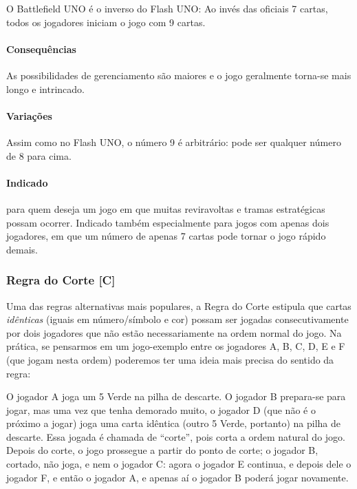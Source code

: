 O Battlefield UNO é o inverso do Flash UNO: Ao invés das oficiais 7 cartas, todos os jogadores iniciam o jogo com 9 cartas.

\paragraph{Consequências}

As possibilidades de gerenciamento são maiores e o jogo geralmente torna-se mais longo e intrincado.

\paragraph{Variações}

Assim como no Flash UNO, o número 9 é arbitrário: pode ser qualquer número de 8 para cima.

\paragraph{Indicado}

para quem deseja um jogo em que muitas reviravoltas e tramas estratégicas possam ocorrer. Indicado também especialmente para jogos com apenas dois jogadores, em que um número de apenas 7 cartas pode tornar o jogo rápido demais.

\subsubsection{Regra do Corte [C]}

\label{regradocorte}

Uma das regras alternativas mais populares, a Regra do Corte estipula que cartas \emph{idênticas} (iguais em número/símbolo e cor) possam ser jogadas consecutivamente por dois jogadores que não estão necessariamente na ordem normal do jogo. Na prática, se pensarmos em um jogo-exemplo entre os jogadores A, B, C, D, E e F (que jogam nesta ordem) poderemos ter uma ideia mais precisa do sentido da regra:

O jogador A joga um 5 Verde na pilha de descarte. O jogador B prepara-se para jogar, mas uma vez que tenha demorado muito, o jogador D (que não é o próximo a jogar) joga uma carta idêntica (outro 5 Verde, portanto) na pilha de descarte. Essa jogada é chamada de ``corte'', pois corta a ordem natural do jogo. Depois do corte, o jogo prossegue a partir do ponto de corte; o jogador B, cortado, não joga, e nem o jogador C: agora o jogador E continua, e depois dele o jogador F, e então o jogador A, e apenas aí o jogador B poderá jogar novamente.

